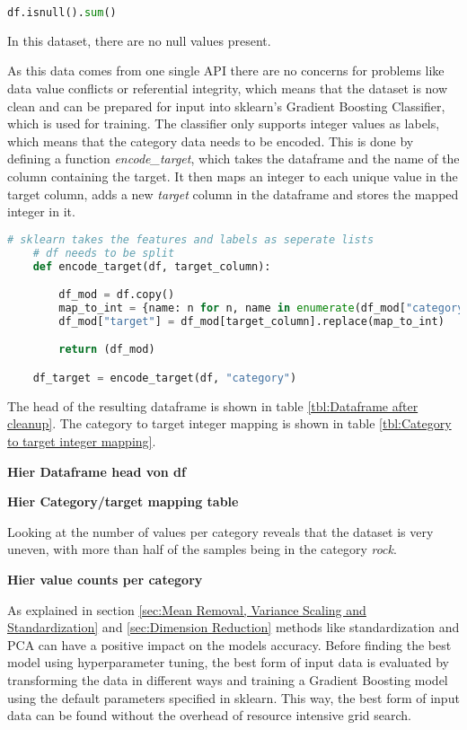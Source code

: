 \begin{lstlisting}[language=Python]
    df.isnull().sum()
\end{lstlisting}

In this dataset, there are no null values present.

As this data comes from one single API there are no concerns for problems like data value conflicts or
referential integrity, which means that the dataset is now clean and can be prepared for input into sklearn's
Gradient Boosting Classifier, which is used for training.
The classifier only supports integer values as labels, which means that the category data needs to be encoded.
This is done by defining a function \emph{encode\_target}, which takes the dataframe and the name of the column containing
the target. It then maps an integer to each unique value in the target column, adds a new \emph{target} column in the
dataframe and stores the mapped integer in it.

\begin{lstlisting}[language=Python]
    # sklearn takes the features and labels as seperate lists
    # df needs to be split
    def encode_target(df, target_column):

        df_mod = df.copy()
        map_to_int = {name: n for n, name in enumerate(df_mod["category"].unique())}
        df_mod["target"] = df_mod[target_column].replace(map_to_int)

        return (df_mod)

    df_target = encode_target(df, "category")
\end{lstlisting}

The head of the resulting dataframe is shown in table \ref{tbl:Dataframe after cleanup}. The category to target integer mapping is shown in table \ref{tbl:Category to target integer mapping}.

\textbf{Hier Dataframe head von df}
\label{tbl:Dataframe after cleanup}

\textbf{Hier Category/target mapping table}
\label{tbl:Category to target integer mapping}

Looking at the number of values per category reveals that the dataset is very uneven, with more than half of
the samples being in the category \emph{rock}.

\textbf{Hier value counts per category}

As explained in section \ref{sec:Mean Removal, Variance Scaling and Standardization} and \ref{sec:Dimension Reduction}
methods like standardization and \ac{PCA} can have a positive impact on the models accuracy.
Before finding the best model using hyperparameter tuning, the best form of input data is evaluated by transforming
the data in different ways and training a Gradient Boosting model using the default parameters specified in sklearn.
This way, the best form of input data can be found without the overhead of resource intensive grid search.


